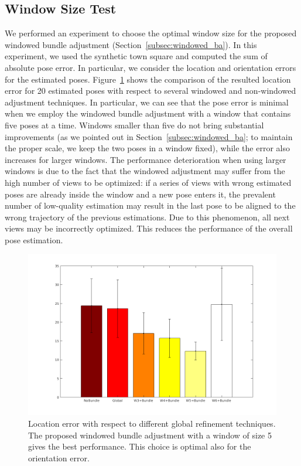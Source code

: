 \subsection{Window Size Test}
We performed an experiment to choose the optimal window size for the proposed windowed
bundle adjustment (Section~\ref{subsec:windowed_ba}). In this experiment, we
used the synthetic town square and computed the sum of absolute pose error. In
particular, we consider the location and orientation errors for the estimated poses.
Figure~\ref{fig:sumAbsLocError} shows the comparison of the resulted location error for 20
estimated poses with respect to several windowed and non-windowed adjustment
techniques.
In particular, we can see that the pose error is minimal when we employ the
windowed bundle adjustment with a window that contains five poses at a time.
Windows smaller than five do not bring substantial improvements (as we pointed out in
Section~\ref{subsec:windowed_ba}; to maintain the proper scale, we keep the two poses
in a window fixed), while the error also increases
for larger windows. The performance deterioration when using larger windows
is due to the fact that the windowed adjustment may suffer from the high number
of views to be optimized: if a series of views with wrong estimated poses are
already inside the window and a new pose enters it, the prevalent number of
low-quality estimation may result in the last pose to be aligned to the wrong trajectory
of the previous estimations. Due to this phenomenon, all next views
may be incorrectly optimized. This reduces the performance of the overall
pose estimation.
%
\begin{figure}[h]
\centering
\includegraphics[width=0.7\linewidth]{img/sumAbsLocError.png}
\caption{Location error with respect to different global refinement techniques. The proposed windowed bundle adjustment with a window of size 5 gives the best performance. This choice is optimal also for the orientation
error.}
\label{fig:sumAbsLocError}
\end{figure}

